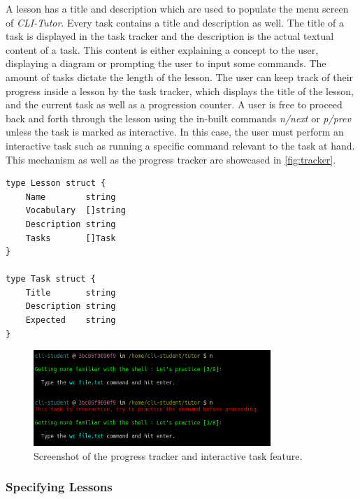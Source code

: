 A lesson has a title and description which are used to populate the menu screen
of \textit{CLI-Tutor}. Every task contains a title and description as well. The
title of a task is displayed in the task tracker and the description is the
actual textual content of a task. This content is either explaining a concept
to the user, displaying a diagram or prompting the user to input some commands.
The amount of tasks dictate the length of the lesson. The user can keep track
of their progress inside a lesson by the task tracker, which displays the title
of the lesson, and the current task as well as a progression counter. A user is free to
proceed back and forth through the lesson using the in-built commands
\textit{n/next} or \textit{p/prev} unless the task is marked as interactive. In
this case, the user must perform an interactive task such as running a specific
command relevant to the task at hand. This mechanism as well as the progress
tracker are showcased in \autoref{fig:tracker}.

\vspace{1em}
\begin{lstlisting}[label=lst:types, frame=single, caption=Data structures for a Lesson and a Task within a Lesson.]
type Lesson struct {
	Name        string
	Vocabulary  []string
	Description string
	Tasks       []Task
}

type Task struct {
	Title       string
	Description string
	Expected    string
}
\end{lstlisting}

\begin{figure}[htbp]
	\centering
	\includegraphics[width=0.8\textwidth]{img/tracker}
	\caption{Screenshot of the progress tracker and interactive task feature.}
	\label{fig:tracker}
\end{figure}
\clearpage

\subsubsection{Specifying Lessons}

